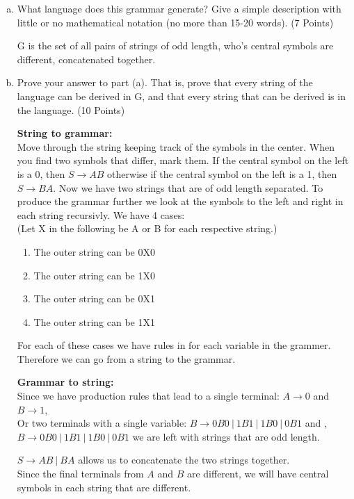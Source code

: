 \documentclass{article}
\begin{document}
\begin{enumerate}[(a)]
\item What language does this grammar generate? Give a simple description with little
or no mathematical notation (no more than 15-20 words). (7 Points)

G is the set of all pairs of strings of odd length, who's central symbols are different,
concatenated together.

\item Prove your answer to part (a). That is, prove that every string of the language
can be derived in G, and that every string that can be derived is in the language. (10 Points)

\textbf{String to grammar:}\\
Move through the string keeping track of the symbols in the center. When you find two symbols
that differ, mark them. If the central symbol on the left is a 0, then $S \rightarrow AB$
otherwise if the central symbol on the left is a 1, then $S \rightarrow BA$. Now we have two
strings that are of odd length separated. To produce the grammar further we look at the symbols
to the left and right in each string recursivly. We have 4 cases:\\
(Let X in the following be A or B for each respective string.)
\begin{enumerate}[1.]
\item The outer string can be 0X0
\item The outer string can be 1X0
\item The outer string can be 0X1
\item The outer string can be 1X1
\end{enumerate}

For each of these cases we have rules in for each variable in the grammer.\\
Therefore we can go from a string to the grammar.

\textbf{Grammar to string:}\\
Since we have production rules that lead to a single terminal: $A \rightarrow 0$ and
$B \rightarrow 1$, \\
Or two terminals with a single variable:
$B \rightarrow 0B0\ |\ 1B1\ |\ 1B0\ |\ 0B1$ and , $B \rightarrow 0B0\ |\ 1B1\ |\ 1B0\ |\ 0B1$
we are left with strings that are odd length.

$S \rightarrow AB\ |\ BA$ allows us to concatenate the two strings together.\\
Since the final terminals from $A$ and $B$ are different, we will have central symbols in each
string that are different.


\end{enumerate}
\end{document}
